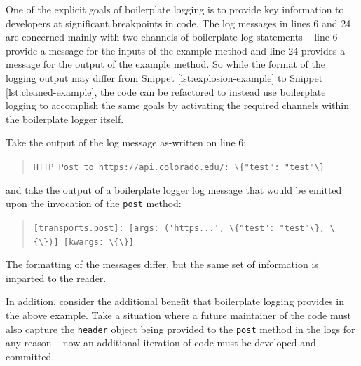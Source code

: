 \documentclass[acmsmall,review,authorversion]{acmart}
\newcommand{\code}[1]{\lstinline[basicstyle=\ttfamily\small]~#1~}
\begin{document}
    One of the explicit goals of boilerplate logging is to provide key information to developers at significant breakpoints in code. The log messages in lines 6 and 24 are concerned mainly with two channels of boilerplate log statements -- line 6 provide a message for the inputs of the example method and line 24 provides a message for the output of the example method. So while the format of the logging output may differ from Snippet \ref{lst:explosion-example} to Snippet \ref{lst:cleaned-example}, the code can be refactored to instead use boilerplate logging to accomplish the same goals by activating the required channels within the boilerplate logger itself.

    Take the output of the log message as-written on line 6:

    \begin{quote}
    \code{HTTP Post to https://api.colorado.edu/: \{"test": "test"\}}
    \end{quote}

    and take the output of a boilerplate logger log message that would be emitted upon the invocation of the \lstinline{post} method:

    \begin{quote}
        \code{[transports.post]: [args: ('https...', \{"test": "test"\}, \{\})] [kwargs: \{\}]}
    \end{quote}

    The formatting of the messages differ, but the same set of information is imparted to the reader.

    In addition, consider the additional benefit that boilerplate logging provides in the above example. Take a situation where a future maintainer of the code must also capture the \lstinline{header} object being provided to the \lstinline{post} method in the logs for any reason -- now an additional iteration of code must be developed and committed.
\end{document}
